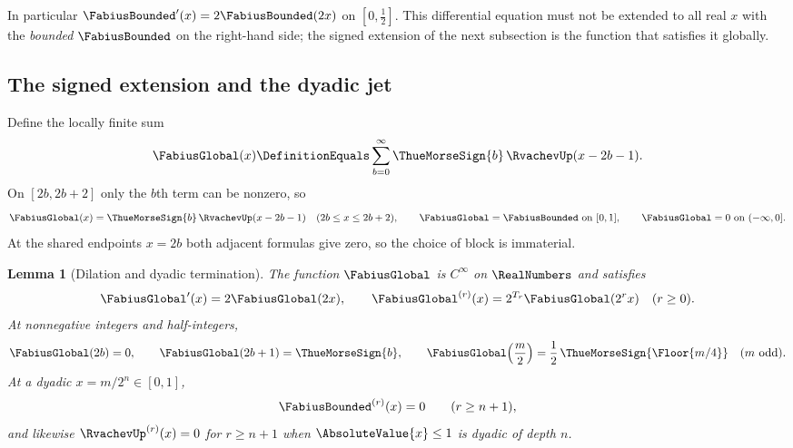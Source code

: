 \documentclass[11pt,oneside]{article}
\theoremstyle{plain}
\newtheorem{lemma}[theorem]{Lemma}
\theoremstyle{definition}
\theoremstyle{remark}
\newcommand{\Fb}{\FabiusBounded}            %
\newcommand{\Fg}{\FabiusGlobal}             %
\newcommand{\up}{\RvachevUp}                %
\newcommand{\tm}[1]{\ThueMorseSign{#1}}     %
\newcommand{\Tr}[1]{T_{#1}}                 %
\begin{document}
In particular $\Fb'(x)=2\Fb(2x)$ on $[0,\tfrac12]$.  This differential
equation must not be extended to all real $x$ with the \emph{bounded} $\Fb$
on the right-hand side; the signed extension of the next subsection is the
function that satisfies it globally.

\subsection{The signed extension and the dyadic jet}
\label{rf:sec:setup-signed}

Define the locally finite sum
\begin{equation}
 \Fg(x)\DefinitionEquals\sum_{b=0}^{\infty}\tm{b}\,\up(x-2b-1).
 \label{rf:eq:setup-global}
\end{equation}
On $[2b,2b+2]$ only the $b$th term can be nonzero, so
\begin{equation}
 \Fg(x)=\tm{b}\,\up(x-2b-1)\quad(2b\le x\le2b+2),\qquad
 \Fg=\Fb\ \text{on }[0,1],\qquad \Fg=0\ \text{on }(-\infty,0].
 \label{rf:eq:setup-global-block}
\end{equation}
At the shared endpoints $x=2b$ both adjacent formulas give zero, so the
choice of block is immaterial.

\begin{lemma}[Dilation and dyadic termination]
\label{rf:lem:setup-dilation}
The function $\Fg$ is $C^{\infty}$ on $\RealNumbers$ and satisfies
\begin{equation}
 \Fg'(x)=2\Fg(2x),\qquad
 \Fg^{(r)}(x)=2^{\Tr{r}}\Fg(2^{r}x)\quad(r\ge0).
 \label{rf:eq:setup-global-derivative}
\end{equation}
At nonnegative integers and half-integers,
\begin{equation}
 \Fg(2b)=0,\qquad\Fg(2b+1)=\tm{b},\qquad
 \Fg\!\left(\frac{m}{2}\right)=\frac12\,\tm{\Floor{m/4}}\quad(m\text{ odd}).
 \label{rf:eq:setup-integer-values}
\end{equation}
At a dyadic $x=m/2^{n}\in[0,1]$,
\begin{equation}
 \Fb^{(r)}(x)=0\qquad(r\ge n+1),
 \label{rf:eq:setup-jet-termination}
\end{equation}
and likewise $\up^{(r)}(x)=0$ for $r\ge n+1$ when $\AbsoluteValue{x}\le1$ is
dyadic of depth $n$.
\end{lemma}
\end{document}
